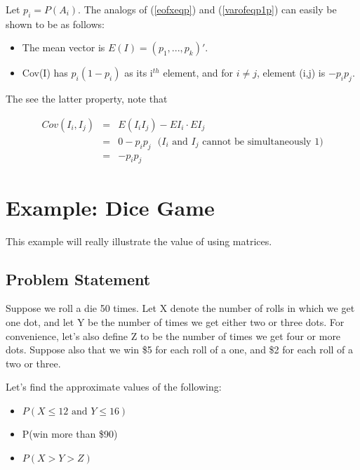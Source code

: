Let $p_i = P(A_i)$.  The analogs of (\ref{eofxeqp}) and
(\ref{varofeqp1p}) can easily be shown to be as follows:

\begin{itemize}

\item The mean vector is $E(I) = (p_1,...,p_k)'$.

\item Cov(I) has $p_i(1-p_i)$ as its i$^{th}$ element, and for 
$i \neq j$, element (i,j) is $-p_i p_j$.

\end{itemize}

The see the latter property, note that

\begin{eqnarray}
Cov(I_i,I_j) &=& E(I_i I_j) - EI_i \cdot EI_j\\ 
&=& 0 - p_i p_j ~~~ \textrm{($I_i$ and $I_j$ cannot be simultaneously 1)} \\
&=& -p_i p_j
\end{eqnarray}

\section{Example:  Dice Game}
\label{dicegame}

This example will really illustrate the value of using matrices.

\subsection{Problem Statement}
\label{bullets3}

Suppose we roll a die 50 times.  Let X denote the number of rolls in
which we get one dot, and let Y be the number of times we get either two
or three dots.  For convenience, let's also define Z to be the number of
times we get four or more dots.  Suppose also that we win \$5 for each
roll of a one, and \$2 for each roll of a two or three. 

Let's find the approximate values of the following:

\begin{itemize}

\item $P(X \leq 12 \textrm{ and } Y \leq 16)$

\item P(win more than \$90)

\item $P(X > Y > Z)$

\end{itemize}

